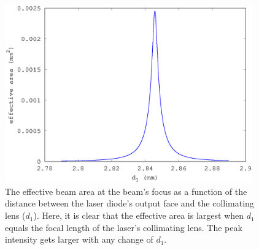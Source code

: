 \begin{figure}
    \centerline{\includegraphics[width=0.95\textwidth]{waists2.eps}}
    \caption[Effective beam area vs distance]{\label{waists2}
        The effective beam area at the beam's focus as a function of the distance between the laser diode's output face and the collimating lens ($d_1$).  Here, it is clear that the effective area is largest when $d_1$ equals the focal length of the laser's collimating lens. The peak intensity gets larger with any change of $d_1$.}
\end{figure}
